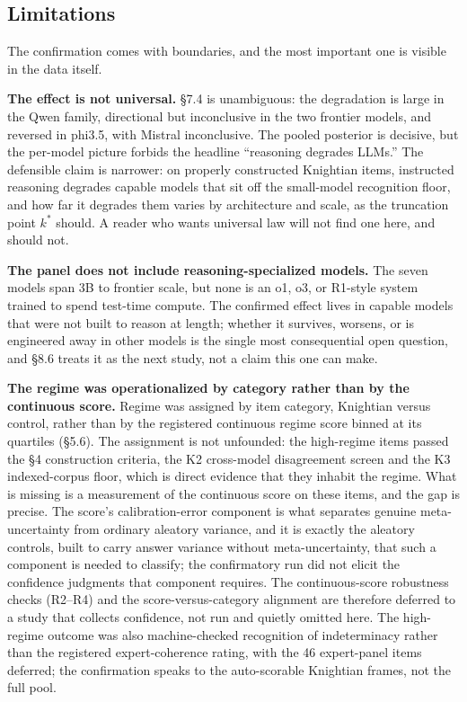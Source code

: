 \documentclass{article}
\begin{document}
\subsection{Limitations}\label{limitations}

The confirmation comes with boundaries, and the most important one is
visible in the data itself.

\textbf{The effect is not universal.} \S{}7.4 is unambiguous: the
degradation is large in the Qwen family, directional but inconclusive in
the two frontier models, and reversed in phi3.5, with Mistral
inconclusive. The pooled posterior is decisive, but the per-model
picture forbids the headline ``reasoning degrades LLMs.'' The defensible
claim is narrower: on properly constructed Knightian items, instructed
reasoning degrades capable models that sit off the small-model
recognition floor, and how far it degrades them varies by architecture
and scale, as the truncation point \(k^{*}\) should. A reader who wants
universal law will not find one here, and should not.

\textbf{The panel does not include reasoning-specialized models.} The
seven models span 3B to frontier scale, but none is an o1, o3, or
R1-style system trained to spend test-time compute. The confirmed effect
lives in capable models that were not built to reason at length; whether
it survives, worsens, or is engineered away in other models is the
single most consequential open question, and \S{}8.6 treats it as the next
study, not a claim this one can make.

\textbf{The regime was operationalized by category rather than by the
continuous score.} Regime was assigned by item category, Knightian
versus control, rather than by the registered continuous regime score
binned at its quartiles (\S{}5.6). The assignment is not unfounded: the
high-regime items passed the \S{}4 construction criteria, the K2
cross-model disagreement screen and the K3 indexed-corpus floor, which
is direct evidence that they inhabit the regime. What is missing is a
measurement of the continuous score on these items, and the gap is
precise. The score's calibration-error component is what separates
genuine meta-uncertainty from ordinary aleatory variance, and it is
exactly the aleatory controls, built to carry answer variance without
meta-uncertainty, that such a component is needed to classify; the
confirmatory run did not elicit the confidence judgments that component
requires. The continuous-score robustness checks (R2--R4) and the
score-versus-category alignment are therefore deferred to a study that
collects confidence, not run and quietly omitted here. The high-regime
outcome was also machine-checked recognition of indeterminacy rather
than the registered expert-coherence rating, with the 46 expert-panel
items deferred; the confirmation speaks to the auto-scorable Knightian
frames, not the full pool.
\end{document}
